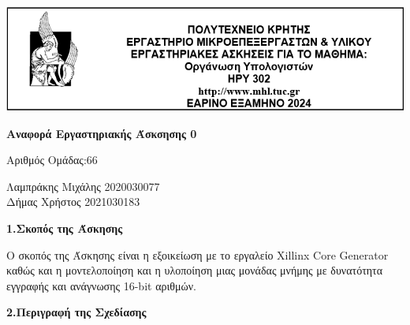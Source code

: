 \documentclass{article}
\begin{document}
\begin{center}
    \vspace*{-2cm} %
    \centering
    \hspace*{-0.1cm} %
    \includegraphics[width=1\textwidth]{Images/Lab_Title.png} %
\end{center}

\vspace{1cm}

\centering
{ \large \bfseries Αναφορά Εργαστηριακής Άσκσησης 0} %

\vspace{0.5cm}

Αριθμός Ομάδας:66\\

\raggedright
Λαμπράκης Μιχάλης   \hspace{2em}        2020030077\\
Δήμας Χρήστος       \hspace{3.8em}      2021030183\\

\vspace{1cm}

{ \large \bfseries 1.Σκοπός της Άσκησης}\\ %

\begin{justify}
\hspace{1.5em}
Ο σκοπός της Άσκησης είναι η εξοικείωση με το εργαλείο 
Xillinx Core Generator
καθώς και η μοντελοποίηση και η υλοποίηση μιας μονάδας μνήμης με δυνατότητα εγγραφής και ανάγνωσης 16-bit αριθμών.

\end{justify}

\vspace{0.5cm}

{ \large \bfseries 2.Περιγραφή της Σχεδίασης}\\ %
\end{document}
